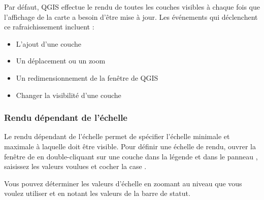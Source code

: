 Par défaut, QGIS effectue le rendu de toutes les couches visibles à chaque fois que l'affichage de la carte a besoin d'être mise à jour. Les événements qui déclenchent ce rafraichissement incluent :

\begin{itemize}
\item L'ajout d'une couche
\item Un déplacement ou un zoom
\item Un redimensionnement de la fenêtre de QGIS
\item Changer la visibilité d'une couche
\end{itemize}

%
%
%
%

\subsubsection{Rendu dépendant de l'échelle}
\label{label_scaledepend}

Le rendu dépendant de l'échelle permet de spécifier l'échelle minimale et maximale à laquelle doit être visible. Pour définir une échelle de rendu, ouvrer la fenêtre de  en double-cliquant sur une couche dans la légende et dans le panneau , saisissez les valeurs voulues et cocher la case .

Vous pouvez déterminer les valeurs d'échelle en zoomant au niveau que vous voulez utiliser et en notant les valeurs de la barre de statut.

